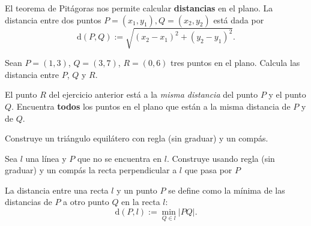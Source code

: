 El teorema de Pitágoras nos permite calcular {\bf distancias} en el plano. La distancia entre dos puntos $P=(x_1,y_1), Q=(x_2,y_2)$ está dada por 
$$\mathrm d(P,Q):=\sqrt{(x_2-x_1)^2+(y_2-y_1)^2}.$$

\begin{ejercicio}
Sean $P=(1,3)$, $Q=(3,7)$, $R=(0,6)$ tres puntos en el plano. Calcula las distancia entre $P$, $Q$ y $R$.
\end{ejercicio}

\begin{ejercicio}\label{P:LugGeoMed}
El punto $R$ del ejercicio anterior está a la \emph{misma distancia} del punto $P$ y el punto $Q$. Encuentra {\bf todos} los puntos en el plano que están a la misma distancia de $P$ y de $Q$.
\end{ejercicio}

\begin{ejercicio}
Construye un triángulo equilátero con regla (sin graduar) y un compás.
\end{ejercicio}

\begin{ejercicio}
Sea $l$ una línea y $P$ que no se encuentra en $l$. Construye usando regla (sin graduar) y un compás la recta perpendicular a $l$ que pasa por $P$
\end{ejercicio}

\newpage 
La distancia entre una recta $l$ y un punto $P$ se define como la mínima de las distancias de $P$ a otro punto $Q$ en la recta $l$: $$\mathrm d(P,l):=\min_{Q\in l} |PQ|.$$

\hspace{1.5cm}

